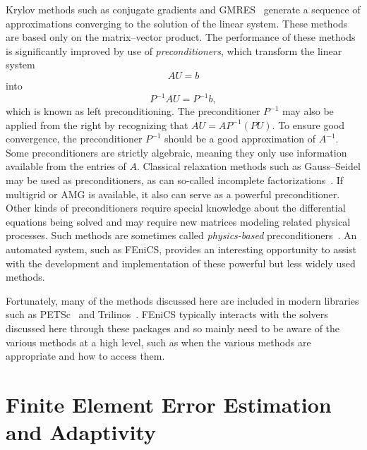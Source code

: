 Krylov methods such as conjugate gradients and
GMRES~\cite{SaadSchultz1986} generate a sequence of approximations
converging to the solution of the linear system. These methods are
based only on the matrix--vector product.  The performance of these
methods is significantly improved by use of \emph{preconditioners},
which transform the linear system
\begin{displaymath}
AU = b
\end{displaymath}
into
\begin{displaymath}
P^{-1} A U = P^{-1} b,
\end{displaymath}
which is known as left preconditioning. The preconditioner $P^{-1}$
may also be applied from the right by recognizing that $A U = A P^{-1}
(P U)$. To ensure good convergence, the preconditioner $P^{-1}$ should
be a good approximation of $A^{-1}$. Some preconditioners are strictly
algebraic, meaning they only use information available from the
entries of \( A \). Classical relaxation methods such as Gauss--Seidel
may be used as preconditioners, as can so-called incomplete
factorizations~\cite{missing}. If multigrid or AMG is available, it
also can serve as a powerful preconditioner. Other kinds of
preconditioners require special knowledge about the differential
equations being solved and may require new matrices modeling related
physical processes.  Such methods are sometimes called
\emph{physics-based} preconditioners~\cite{missing}. An automated
system, such as FEniCS, provides an interesting opportunity to assist
with the development and implementation of these powerful but less
widely used methods.


Fortunately, many of the methods discussed here are included in modern
libraries such as PETSc~\cite{BalayBuschelmanEijkhoutEtAl2004} and
Trilinos~\cite{HerouxBartlettHowleEtAl2005}. FEniCS typically interacts
with the solvers discussed here through these packages and so mainly
need to be aware of the various methods at a high level, such as when
the various methods are appropriate and how to access them.

\section{Finite Element Error Estimation and Adaptivity}

